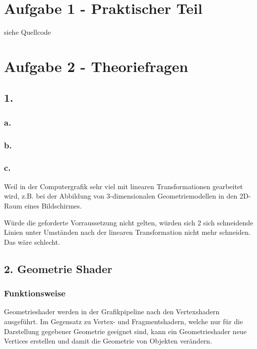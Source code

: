 \documentclass[12pt]{scrreprt}
\begin{document}


\chapter*{Aufgabe 1 - Praktischer Teil}

siehe Quellcode

\chapter*{Aufgabe 2 - Theoriefragen}
\section*{1.}

\subsection*{a.}

\subsection*{b.}

\subsection*{c.}

Weil in der Computergrafik sehr viel mit linearen Transformationen
gearbeitet wird, z.B. bei der Abbildung von 3-dimensionalen
Geometriemodellen in den 2D-Raum eines Bildschirmes.

Würde die geforderte Vorraussetzung nicht gelten, würden sich 2 sich
schneidende Linien unter Umständen nach der linearen Transformation
nicht mehr schneiden. Das wäre schlecht.


\section*{2. Geometrie Shader}

\subsection*{Funktionsweise}

Geometrieshader werden in der Grafikpipeline nach den Vertexshadern
ausgeführt.
Im Gegensatz zu Vertex- und Fragmentshadern, welche nur für die
Darstellung gegebener Geometrie geeignet sind, kann ein
Geometrieshader neue Vertices erstellen und damit die Geometrie von
Objekten verändern.
\end{document}
